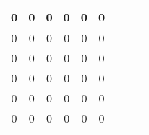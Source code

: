 \documentclass[10pt,a4paper,landscape]{article}
\begin{document}
\begin{tabular}{|c|c|c|c|c|c|c|c|c|}
\hline
0 & 0 & 0 & 0 & 0 & 0 \\
\hline 
0 & 0 & 0 & 0 & 0 & 0 \\
\hline 
0 & 0 & 0 & 0 & 0 & 0 \\
\hline
0 & 0 & 0 & 0 & 0 & 0 \\
\hline
0 & 0 & 0 & 0 & 0 & 0 \\
\hline
0 & 0 & 0 & 0 & 0 & 0 \\
\hline
\end{tabular} 
\end{document}
